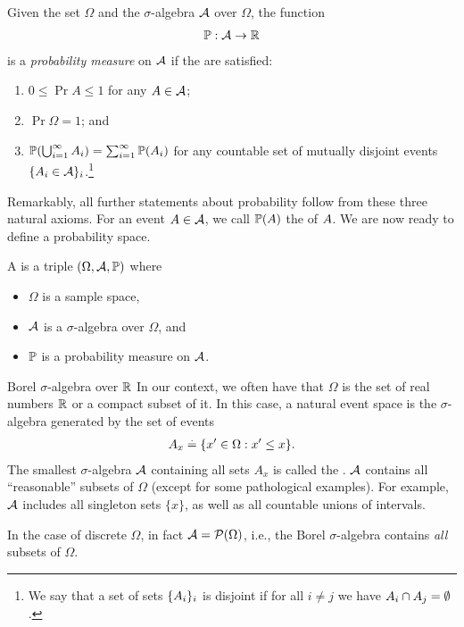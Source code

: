 \begin{defn}
  Given the set $\Omega$ and the $\sigma$-algebra $\mathcal{A}$ over $\Omega$, the function \begin{align*}
    \mathbb{P} : \mathcal{A} \to \mathbb{R}
  \end{align*} is a \emph{probability measure} on $\mathcal{A}$ if the  are satisfied: \begin{enumerate}
    \item $0 \leq \Pr{A} \leq 1$ for any $A \in \mathcal{A}$;
    \item $\Pr{\Omega} = 1$; and
    \item $\Pr{\bigcup_{i=1}^\infty \sA_i} = \sum_{i=1}^\infty \Pr{\sA_i}$ for any countable set of mutually disjoint events $\{A_i \in \mathcal{A}\}_i$.\footnote{We say that a set of sets $\{A_i\}_i$ is disjoint if for all $i \neq j$ we have $A_i \cap A_j = \emptyset$.}
  \end{enumerate}
\end{defn}
Remarkably, all further statements about probability follow from these three natural axioms.
For an event $A \in \mathcal{A}$, we call $\Pr{\sA}$ the  of $A$.
We are now ready to define a probability space.

\begin{defn}
  A  is a triple $(\Omega, \mathcal{A}, \mathbb{P})$ where \begin{itemize}
    \item $\Omega$ is a sample space,
    \item $\mathcal{A}$ is a $\sigma$-algebra over $\Omega$, and
    \item $\mathbb{P}$ is a probability measure on $\mathcal{A}$.
  \end{itemize}
\end{defn}

\begin{ex}{Borel $\sigma$-algebra over $\mathbb{R}$}{}
  In our context, we often have that $\Omega$ is the set of real numbers $\mathbb{R}$ or a compact subset of it.
  In this case, a natural event space is the $\sigma$-algebra generated by the set of events \begin{align*}
    A_x \overset{.}{=} \{x '\in \Omega : x' \leq x\}.
  \end{align*}
  The smallest $\sigma$-algebra $\mathcal{A}$ containing all sets $A_x$ is called the .
  $\mathcal{A}$ contains all ``reasonable'' subsets of $\Omega$ (except for some pathological examples).
  For example, $\mathcal{A}$ includes all singleton sets $\{x\}$, as well as all countable unions of intervals.

  In the case of discrete $\Omega$, in fact $\spA=\pset{\Omega}$, i.e., the Borel $\sigma$-algebra contains {\em all} subsets of $\Omega$.
\end{ex}

